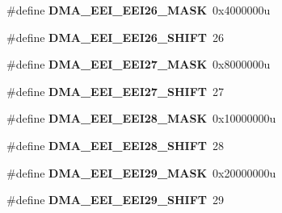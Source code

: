 \begin{DoxyCompactItemize}
\item 
\hypertarget{group___d_m_a___register___masks_ga759d3e7cbae8ffe420bc38c8f4bdfec8}{}\#define {\bfseries D\+M\+A\+\_\+\+E\+E\+I\+\_\+\+E\+E\+I26\+\_\+\+M\+A\+S\+K}~0x4000000u\label{group___d_m_a___register___masks_ga759d3e7cbae8ffe420bc38c8f4bdfec8}

\item 
\hypertarget{group___d_m_a___register___masks_ga1025848c9622dd5fa77f86363b99cbbd}{}\#define {\bfseries D\+M\+A\+\_\+\+E\+E\+I\+\_\+\+E\+E\+I26\+\_\+\+S\+H\+I\+F\+T}~26\label{group___d_m_a___register___masks_ga1025848c9622dd5fa77f86363b99cbbd}

\item 
\hypertarget{group___d_m_a___register___masks_gac3cb55f89dfdfe0cd09bafe2e350600c}{}\#define {\bfseries D\+M\+A\+\_\+\+E\+E\+I\+\_\+\+E\+E\+I27\+\_\+\+M\+A\+S\+K}~0x8000000u\label{group___d_m_a___register___masks_gac3cb55f89dfdfe0cd09bafe2e350600c}

\item 
\hypertarget{group___d_m_a___register___masks_ga2f8c0a8d827d218ce15ef4be6cdc7673}{}\#define {\bfseries D\+M\+A\+\_\+\+E\+E\+I\+\_\+\+E\+E\+I27\+\_\+\+S\+H\+I\+F\+T}~27\label{group___d_m_a___register___masks_ga2f8c0a8d827d218ce15ef4be6cdc7673}

\item 
\hypertarget{group___d_m_a___register___masks_ga987eb77c9426dc8c7023a85c35b8bce9}{}\#define {\bfseries D\+M\+A\+\_\+\+E\+E\+I\+\_\+\+E\+E\+I28\+\_\+\+M\+A\+S\+K}~0x10000000u\label{group___d_m_a___register___masks_ga987eb77c9426dc8c7023a85c35b8bce9}

\item 
\hypertarget{group___d_m_a___register___masks_ga2538221edd613f08df3f7bfaa5407d00}{}\#define {\bfseries D\+M\+A\+\_\+\+E\+E\+I\+\_\+\+E\+E\+I28\+\_\+\+S\+H\+I\+F\+T}~28\label{group___d_m_a___register___masks_ga2538221edd613f08df3f7bfaa5407d00}

\item 
\hypertarget{group___d_m_a___register___masks_gac7257b214ce99fae89901e45ac0a5492}{}\#define {\bfseries D\+M\+A\+\_\+\+E\+E\+I\+\_\+\+E\+E\+I29\+\_\+\+M\+A\+S\+K}~0x20000000u\label{group___d_m_a___register___masks_gac7257b214ce99fae89901e45ac0a5492}

\item 
\hypertarget{group___d_m_a___register___masks_ga08ea3e7e660a5d17e901a4a677cef894}{}\#define {\bfseries D\+M\+A\+\_\+\+E\+E\+I\+\_\+\+E\+E\+I29\+\_\+\+S\+H\+I\+F\+T}~29\label{group___d_m_a___register___masks_ga08ea3e7e660a5d17e901a4a677cef894}


\end{DoxyCompactItemize}

